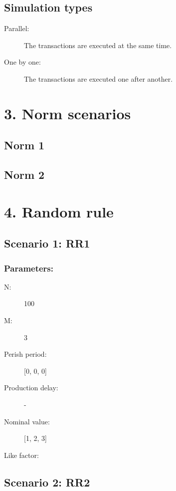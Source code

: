 \documentclass{article}
\begin{document}
\subsection{Simulation types}
\begin{description}
  \item[Parallel:] The transactions are executed at the same time.
  \item[One by one:] The transactions are executed one after another.
\end{description}


\section{3. Norm scenarios}
\subsection{Norm 1}

\subsection{Norm 2}

\section{4. Random rule}

\subsection{Scenario 1: RR1}
\subsubsection{Parameters:}
\begin{description}
  \item[N:] 100
  \item[M:] 3
  \item[Perish period:] [0, 0, 0]
  \item[Production delay:] -
  \item[Nominal value:] [1, 2, 3]
  \item[Like factor:] 
\end{description}


\subsection{Scenario 2: RR2}
\end{document}
